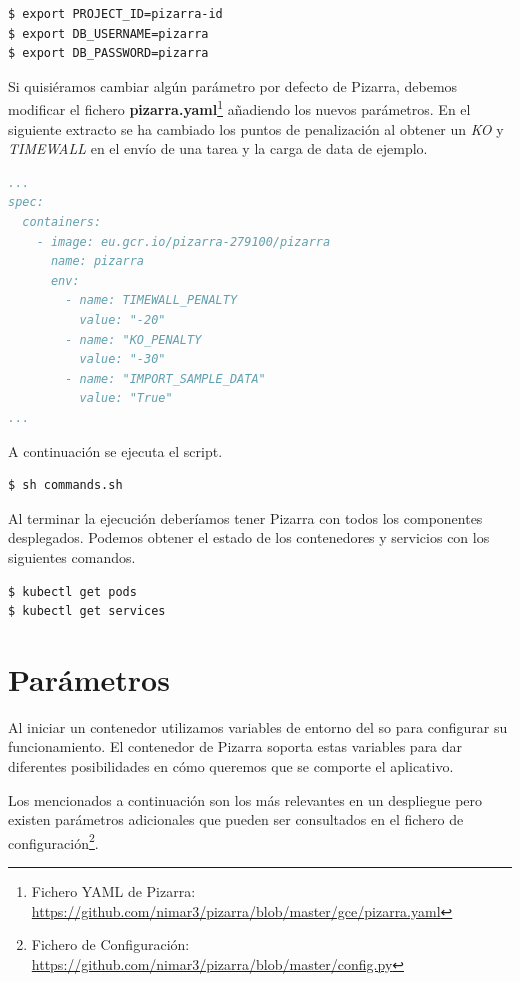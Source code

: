 \documentclass[11pt,spanish,listoffigures,listoftables]{tfgetsinf}
\begin{document}
\begin{lstlisting}[language=bash]
$ export PROJECT_ID=pizarra-id
$ export DB_USERNAME=pizarra
$ export DB_PASSWORD=pizarra
\end{lstlisting}

Si quisiéramos cambiar algún parámetro por defecto de Pizarra, debemos modificar el fichero \textbf{pizarra.yaml}\footnote{Fichero YAML de Pizarra: \url{https://github.com/nimar3/pizarra/blob/master/gce/pizarra.yaml}} añadiendo los nuevos parámetros. En el siguiente extracto se ha cambiado los puntos de penalización al obtener un \textit{KO} y \textit{TIMEWALL} en el envío de una \Gls{tarea} y la carga de data de ejemplo.

\begin{lstlisting}[language=yaml]
...
spec:
  containers:
    - image: eu.gcr.io/pizarra-279100/pizarra
      name: pizarra
      env:
        - name: TIMEWALL_PENALTY
          value: "-20"
        - name: "KO_PENALTY
          value: "-30"
        - name: "IMPORT_SAMPLE_DATA"
          value: "True"
...          
\end{lstlisting}

A continuación se ejecuta el script.

\begin{lstlisting}[language=bash]
$ sh commands.sh
\end{lstlisting}

Al terminar la ejecución deberíamos tener Pizarra con todos los componentes desplegados. Podemos obtener el estado de los contenedores y servicios con los siguientes comandos.

\begin{lstlisting}[language=bash]
$ kubectl get pods
$ kubectl get services
\end{lstlisting}

\section{Parámetros}

Al iniciar un \Gls{contenedor} utilizamos variables de entorno del \acrshort{so} para configurar su funcionamiento. El \Gls{contenedor} de Pizarra soporta estas variables para dar diferentes posibilidades en cómo queremos que se comporte el aplicativo. 

Los mencionados a continuación son los más relevantes en un despliegue pero existen parámetros adicionales que pueden ser consultados en el fichero de configuración\footnote{Fichero de Configuración: \url{https://github.com/nimar3/pizarra/blob/master/config.py}}.
\end{document}
